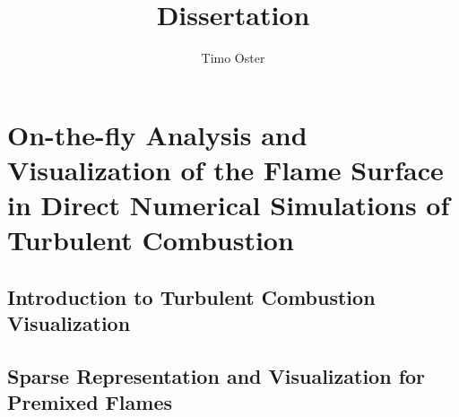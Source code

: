 \documentclass[BCOR=15mm, DIV=8]{scrbook}
\title{ Dissertation }
\author{ Timo Oster }
\begin{document}

\frontmatter

\maketitle

\tableofcontents

\mainmatter





\part[On-the-fly Analysis and Visualization of Turbulent Combustion Simulations]
        {On-the-fly Analysis and Visualization of the Flame Surface
         in Direct Numerical Simulations of Turbulent Combustion} %
\label{part:on_the_fly}

\chapter{Introduction to Turbulent Combustion Visualization} %
\label{cha:turbulent_combustion}


\chapter{Sparse Representation and Visualization for Premixed Flames} %
\label{cha:sparse_representation}
%
\tikzset{external/export=false}
\tikzset{external/export=true}
%







%
\end{document}
